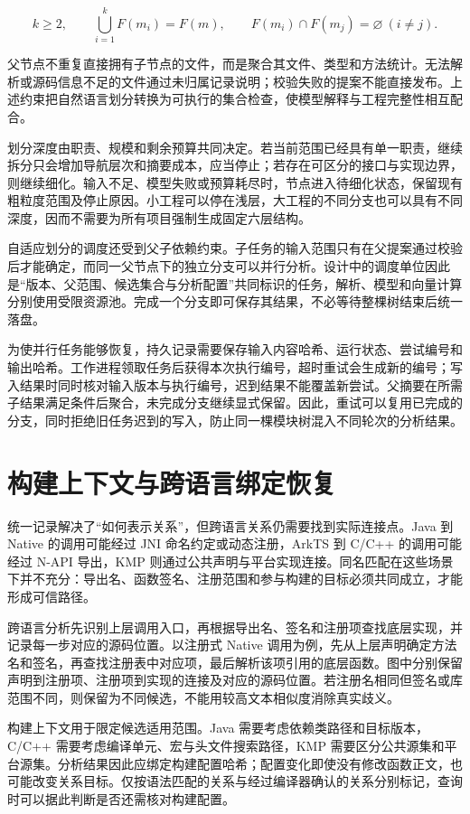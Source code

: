 \begin{equation}
k\geq 2,\qquad \bigcup_{i=1}^{k}F(m_i)=F(m),\qquad F(m_i)\cap F(m_j)=\varnothing\ (i\neq j).
\end{equation}

父节点不重复直接拥有子节点的文件，而是聚合其文件、类型和方法统计。无法解析或源码信息不足的文件通过未归属记录说明；校验失败的提案不能直接发布。上述约束把自然语言划分转换为可执行的集合检查，使模型解释与工程完整性相互配合。

划分深度由职责、规模和剩余预算共同决定。若当前范围已经具有单一职责，继续拆分只会增加导航层次和摘要成本，应当停止；若存在可区分的接口与实现边界，则继续细化。输入不足、模型失败或预算耗尽时，节点进入待细化状态，保留现有粗粒度范围及停止原因。小工程可以停在浅层，大工程的不同分支也可以具有不同深度，因而不需要为所有项目强制生成固定六层结构。

自适应划分的调度还受到父子依赖约束。子任务的输入范围只有在父提案通过校验后才能确定，而同一父节点下的独立分支可以并行分析。设计中的调度单位因此是“版本、父范围、候选集合与分析配置”共同标识的任务，解析、模型和向量计算分别使用受限资源池。完成一个分支即可保存其结果，不必等待整棵树结束后统一落盘。

为使并行任务能够恢复，持久记录需要保存输入内容哈希、运行状态、尝试编号和输出哈希。工作进程领取任务后获得本次执行编号，超时重试会生成新的编号；写入结果时同时核对输入版本与执行编号，迟到结果不能覆盖新尝试。父摘要在所需子结果满足条件后聚合，未完成分支继续显式保留。因此，重试可以复用已完成的分支，同时拒绝旧任务迟到的写入，防止同一棵模块树混入不同轮次的分析结果。

\section{构建上下文与跨语言绑定恢复}

统一记录解决了“如何表示关系”，但跨语言关系仍需要找到实际连接点。Java 到 Native 的调用可能经过 JNI 命名约定或动态注册，ArkTS 到 C/C++ 的调用可能经过 N-API 导出，KMP 则通过公共声明与平台实现连接。同名匹配在这些场景下并不充分：导出名、函数签名、注册范围和参与构建的目标必须共同成立，才能形成可信路径。

跨语言分析先识别上层调用入口，再根据导出名、签名和注册项查找底层实现，并记录每一步对应的源码位置。以注册式 Native 调用为例，先从上层声明确定方法名和签名，再查找注册表中对应项，最后解析该项引用的底层函数。图中分别保留声明到注册项、注册项到实现的连接及对应的源码位置。若注册名相同但签名或库范围不同，则保留为不同候选，不能用较高文本相似度消除真实歧义。

构建上下文用于限定候选适用范围。Java 需要考虑依赖类路径和目标版本，C/C++ 需要考虑编译单元、宏与头文件搜索路径，KMP 需要区分公共源集和平台源集。分析结果因此应绑定构建配置哈希；配置变化即使没有修改函数正文，也可能改变关系目标。仅按语法匹配的关系与经过编译器确认的关系分别标记，查询时可以据此判断是否还需核对构建配置。

